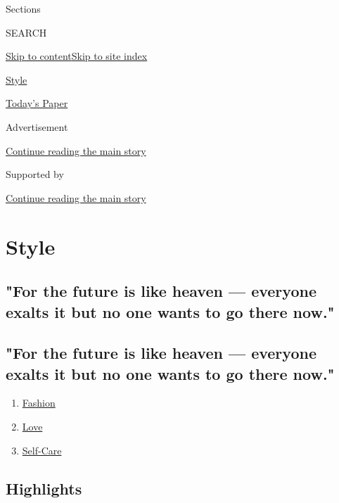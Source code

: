 Sections

SEARCH

\protect\hyperlink{site-content}{Skip to
content}\protect\hyperlink{site-index}{Skip to site index}

\href{https://www.nytimes.com/section/style}{Style}

\href{https://myaccount.nytimes.com/auth/login?response_type=cookie\&client_id=vi}{}

\href{https://www.nytimes.com/section/todayspaper}{Today's Paper}

Advertisement

\protect\hyperlink{after-top}{Continue reading the main story}

Supported by

\protect\hyperlink{after-sponsor}{Continue reading the main story}

\hypertarget{style}{%
\section{Style}\label{style}}

\hypertarget{for-the-future-is-like-heaven--everyone-exalts-it-but-no-one-wants-to-go-there-now}{%
\subsection{"For the future is like heaven --- everyone exalts it but no
one wants to go there
now."}\label{for-the-future-is-like-heaven--everyone-exalts-it-but-no-one-wants-to-go-there-now}}

\hypertarget{for-the-future-is-like-heaven--everyone-exalts-it-but-no-one-wants-to-go-there-now-1}{%
\subsection{"For the future is like heaven --- everyone exalts it but no
one wants to go there
now."}\label{for-the-future-is-like-heaven--everyone-exalts-it-but-no-one-wants-to-go-there-now-1}}

\begin{enumerate}
\def\labelenumi{\arabic{enumi}.}
\tightlist
\item
  \href{/section/fashion}{Fashion}
\item
  \href{/section/style/love}{Love}
\item
  \href{/section/style/self-care}{Self-Care}
\end{enumerate}

\hypertarget{highlights}{%
\subsection{Highlights}\label{highlights}}

